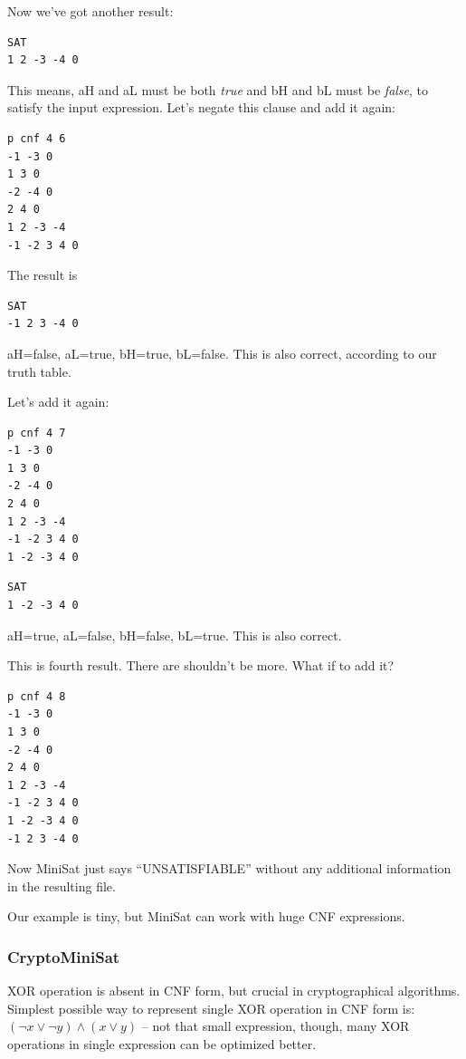 Now we've got another result:

\begin{lstlisting}
SAT
1 2 -3 -4 0
\end{lstlisting}

This means, aH and aL must be both \textit{true} and bH and bL must be \textit{false}, to satisfy the input expression.
Let's negate this clause and add it again:

\begin{lstlisting}
p cnf 4 6
-1 -3 0
1 3 0
-2 -4 0
2 4 0
1 2 -3 -4
-1 -2 3 4 0
\end{lstlisting}

The result is

\begin{lstlisting}
SAT
-1 2 3 -4 0
\end{lstlisting}

aH=false, aL=true, bH=true, bL=false. This is also correct, according to our truth table.

Let's add it again:

\begin{lstlisting}
p cnf 4 7
-1 -3 0
1 3 0
-2 -4 0
2 4 0
1 2 -3 -4
-1 -2 3 4 0
1 -2 -3 4 0
\end{lstlisting}

\begin{lstlisting}
SAT
1 -2 -3 4 0
\end{lstlisting}

aH=true, aL=false, bH=false, bL=true. This is also correct.

This is fourth result. There are shouldn't be more. What if to add it?

\begin{lstlisting}
p cnf 4 8
-1 -3 0
1 3 0
-2 -4 0
2 4 0
1 2 -3 -4
-1 -2 3 4 0
1 -2 -3 4 0
-1 2 3 -4 0
\end{lstlisting}

Now MiniSat just says ``UNSATISFIABLE'' without any additional information in the resulting file.

Our example is tiny, but MiniSat can work with huge CNF expressions.

\subsubsection{CryptoMiniSat}

XOR operation is absent in CNF form, but crucial in cryptographical algorithms.
Simplest possible way to represent single XOR operation in CNF form is: $(\neg x \vee \neg y) \wedge (x \vee y)$ -- not that small expression, 
though, many XOR operations in single expression can be optimized better.

